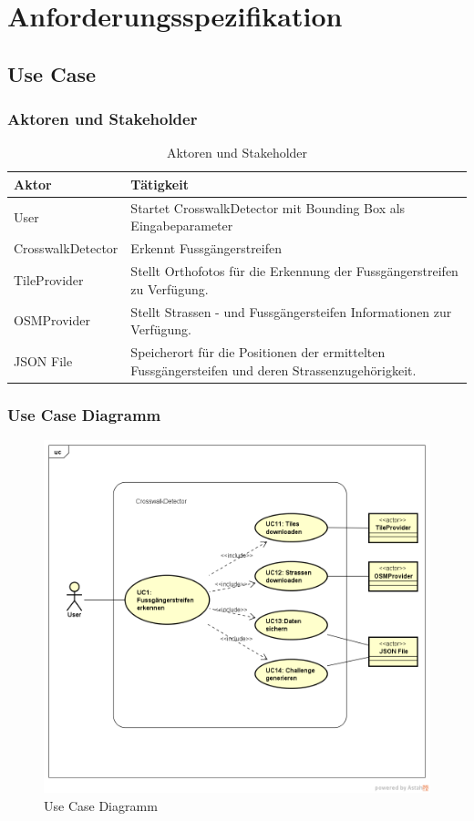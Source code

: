 \section{Anforderungsspezifikation}
\subsection{Use Case}
\subsubsection{Aktoren und Stakeholder}
\begin{table}[H]
    \begin{tabular}{|p{3cm}|p{9cm}|}
    \hline
    \rowcolor{lightblue}
    Aktor & Tätigkeit   \\ \hline
	User  & Startet CrosswalkDetector mit Bounding Box als Eingabeparameter \\ \hline
	CrosswalkDetector & Erkennt Fussgängerstreifen \\ \hline 
	TileProvider & Stellt Orthofotos für die Erkennung der Fussgängerstreifen zu Verfügung.\\ \hline
	OSMProvider & Stellt Strassen - und Fussgängersteifen Informationen zur Verfügung. \\ \hline
	JSON File & Speicherort für die Positionen der ermittelten Fussgängersteifen und deren Strassenzugehörigkeit.\\ \hline
    \end{tabular}
    \caption[Aktoren und Stakeholder]{Aktoren und Stakeholder}
\end{table}

\subsubsection{Use Case Diagramm}
\begin{figure}[H]
\centering
\includegraphics[width=420pt]{images/UseCase.png}
\caption[Use Case Diagramm]{Use Case Diagramm}
\end{figure}

